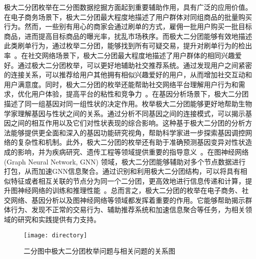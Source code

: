 极大二分团枚举在二分图数据挖掘方面起到重要辅助作用，具有广泛的应用价值。在电子商务场景下，极大二分团最大程度地描述了用户群体对同组商品的批量购买行为。然而，一些别有用心的商家会通过刷单的方式，雇佣一批用户购买一批目标商品，进而提高目标商品的曝光率，扰乱市场秩序。而极大二分团能够有效地描述此类刷单行为，通过枚举二分团，能够找到所有可疑交易，提升对刷单行为的检出率~\cite{clickfarm21,MEB20,MEB22}。在社交网络场景下，极大二分团最大程度地描述了用户群体的相同兴趣爱好。通过极大二分团枚举，可以更好地辅助社交推荐系统。通过发现用户之间紧密的连接关系，可以推荐给用户其他拥有相似兴趣爱好的用户，从而增加社交互动和用户满意度。同时，极大二分团的枚举还能帮助社交网络平台理解用户行为和需求，优化用户体验，提高平台的粘性和竞争力~\cite{minel06}。在基因分析场景下，极大二分团描述了同一组基因对同一组性状的决定作用。枚举极大二分团能够更好地帮助生物学家理解基因与性状之间的关系。通过分析不同基因之间的连接模式，可以揭示基因之间的相互作用以及它们对性状表现的综合影响。这种基于极大二分团的分析方法能够提供更全面和深入的基因功能研究视角，帮助科学家进一步探索基因调控网络的复杂性和机制。此外，极大二分团的枚举还有助于准确预测基因变异对性状造成的影响，并为疾病研究、遗传工程等领域提供重要的指导意义~\cite{gene22,iMBEA14,protein21}。在图神经网络 (Graph Neural Network, GNN) 领域，极大二分团能够辅助对多个节点数据进行打包，从而加速GNN信息聚合。通过识别和利用极大二分团结构，可以将具有相似特征或者相互关联的节点分为同一个二分团，更高效地进行信息传递和计算，提升图神经网络的训练和推理性能~\cite{PQ21}。总而言之，极大二分团的枚举在电子商务、社交网络、基因分析以及图神经网络等领域都发挥着重要的作用。它能够帮助揭示群体行为、发现不正常的交易行为、辅助推荐系统和加速信息聚合等任务，为相关领域的研究和实践提供有力支持。

\begin{figure} [ht]
  \centering
  \texttt{[image: directory]}
  \caption{二分图中极大二分团枚举问题与相关问题的关系图}
  \label{fig:directory}
\end{figure}

